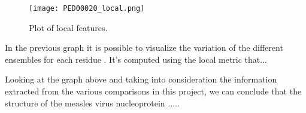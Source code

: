 \begin{figure}[H]
	\begin{minipage}[b]{0.9\textwidth}
		\centering
		\texttt{[image: PED00020\_local.png]}
		\caption{Plot of local features.}
		\label{plot}
	\end{minipage}	
\end{figure}
In the previous graph it is possible to visualize the variation of the different ensembles for each residue . It's computed using the local metric that...

Looking at the graph above and taking into consideration the information extracted from the various comparisons in this project, we can conclude that the structure of the measles virus nucleoprotein ..... 